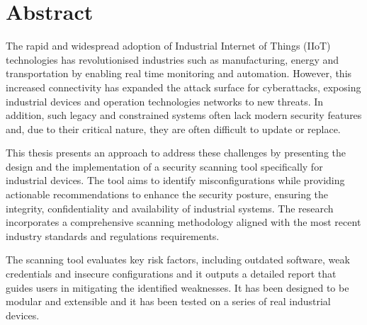 \chapter*{Abstract} %
\label{abtract}


The rapid and widespread adoption of Industrial Internet of Things (IIoT) technologies has revolutionised industries such as manufacturing, energy and transportation by enabling real time monitoring and automation. However, this increased connectivity has expanded the attack surface for cyberattacks, exposing industrial devices and operation technologies networks to new threats. In addition, such legacy and constrained systems often lack modern security features and, due to their critical nature, they are often difficult to update or replace.

This thesis presents an approach to address these challenges by presenting the design and the implementation of a security scanning tool specifically for industrial devices. The tool aims to identify misconfigurations while providing actionable recommendations to enhance the security posture, ensuring the integrity, confidentiality and availability of industrial systems. The research incorporates a comprehensive scanning methodology aligned with the most recent industry standards and regulations requirements.

The scanning tool evaluates key risk factors, including outdated software, weak credentials and insecure configurations and it outputs a detailed report that guides users in mitigating the identified weaknesses. It has been designed to be modular and extensible and it has been tested on a series of real industrial devices.
